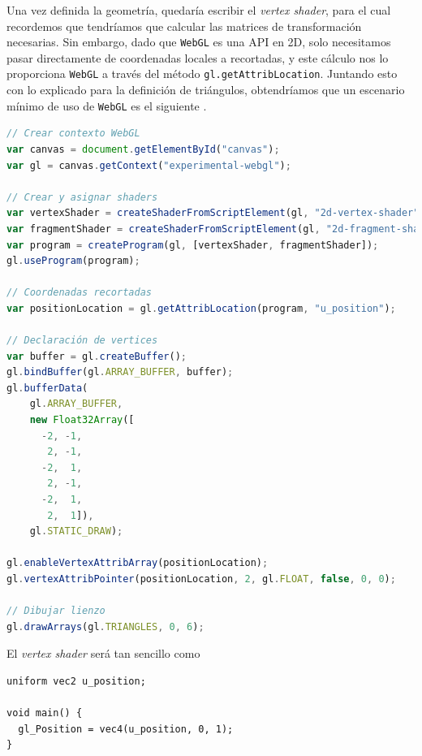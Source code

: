 Una vez definida la geometría, quedaría escribir el \textit{vertex shader}, para el cual recordemos que tendríamos que calcular las matrices de transformación necesarias. Sin embargo, dado que \texttt{WebGL} es una API en 2D, solo necesitamos pasar directamente de coordenadas locales a recortadas, y este cálculo nos lo proporciona \texttt{WebGL} a través del método \texttt{gl.getAttribLocation}. Juntando esto con lo explicado para la definición de triángulos, obtendríamos que un escenario mínimo de uso de \texttt{WebGL} es el siguiente \cite{webgl_ejemplo}.
\begin{lstlisting}[language=JavaScript]
// Crear contexto WebGL
var canvas = document.getElementById("canvas");
var gl = canvas.getContext("experimental-webgl");

// Crear y asignar shaders
var vertexShader = createShaderFromScriptElement(gl, "2d-vertex-shader");
var fragmentShader = createShaderFromScriptElement(gl, "2d-fragment-shader");
var program = createProgram(gl, [vertexShader, fragmentShader]);
gl.useProgram(program);

// Coordenadas recortadas
var positionLocation = gl.getAttribLocation(program, "u_position");

// Declaración de vertices
var buffer = gl.createBuffer();
gl.bindBuffer(gl.ARRAY_BUFFER, buffer);
gl.bufferData(
    gl.ARRAY_BUFFER,
    new Float32Array([
      -2, -1,
       2, -1,
      -2,  1,
       2, -1,
      -2,  1,
       2,  1]),
    gl.STATIC_DRAW);
    
gl.enableVertexAttribArray(positionLocation);
gl.vertexAttribPointer(positionLocation, 2, gl.FLOAT, false, 0, 0);

// Dibujar lienzo
gl.drawArrays(gl.TRIANGLES, 0, 6);
\end{lstlisting}
El \textit{vertex shader} será tan sencillo como
\begin{lstlisting}
uniform vec2 u_position;

void main() {
  gl_Position = vec4(u_position, 0, 1);
}
\end{lstlisting}



